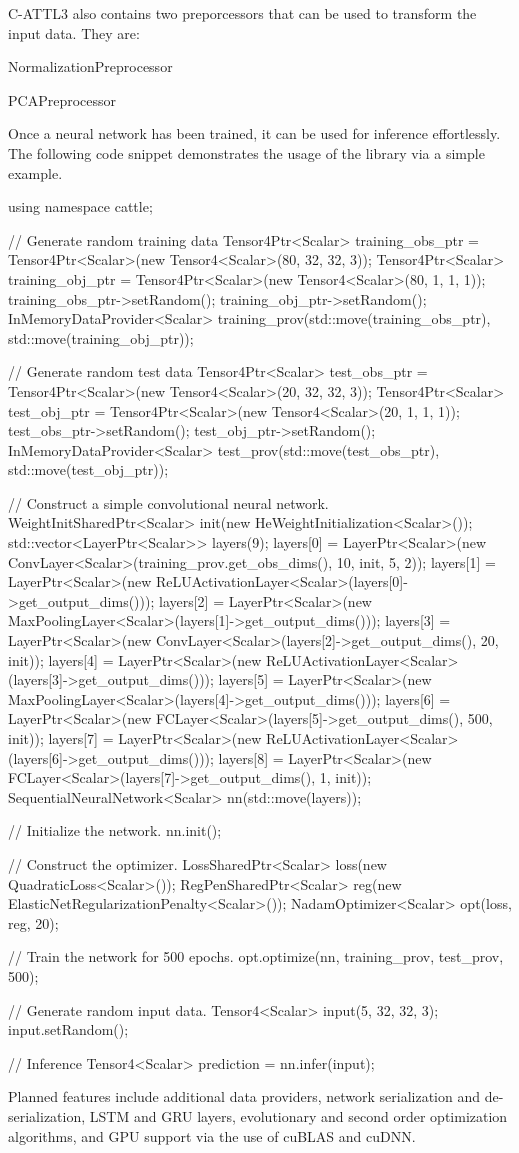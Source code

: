 C-\/\+A\+T\+T\+L3 also contains two preporcessors that can be used to transform the input data. They are\+:
\begin{DoxyItemize}
\item Normalization\+Preprocessor
\item P\+C\+A\+Preprocessor
\end{DoxyItemize}

Once a neural network has been trained, it can be used for inference effortlessly. The following code snippet demonstrates the usage of the library via a simple example. \begin{DoxyVerb}using namespace cattle;

// Generate random training data
Tensor4Ptr<Scalar> training_obs_ptr = Tensor4Ptr<Scalar>(new Tensor4<Scalar>(80, 32, 32, 3));
Tensor4Ptr<Scalar> training_obj_ptr = Tensor4Ptr<Scalar>(new Tensor4<Scalar>(80, 1, 1, 1));
training_obs_ptr->setRandom();
training_obj_ptr->setRandom();
InMemoryDataProvider<Scalar> training_prov(std::move(training_obs_ptr), std::move(training_obj_ptr));

// Generate random test data
Tensor4Ptr<Scalar> test_obs_ptr = Tensor4Ptr<Scalar>(new Tensor4<Scalar>(20, 32, 32, 3));
Tensor4Ptr<Scalar> test_obj_ptr = Tensor4Ptr<Scalar>(new Tensor4<Scalar>(20, 1, 1, 1));
test_obs_ptr->setRandom();
test_obj_ptr->setRandom();
InMemoryDataProvider<Scalar> test_prov(std::move(test_obs_ptr), std::move(test_obj_ptr));

// Construct a simple convolutional neural network.
WeightInitSharedPtr<Scalar> init(new HeWeightInitialization<Scalar>());
std::vector<LayerPtr<Scalar>> layers(9);
layers[0] = LayerPtr<Scalar>(new ConvLayer<Scalar>(training_prov.get_obs_dims(), 10, init, 5, 2));
layers[1] = LayerPtr<Scalar>(new ReLUActivationLayer<Scalar>(layers[0]->get_output_dims()));
layers[2] = LayerPtr<Scalar>(new MaxPoolingLayer<Scalar>(layers[1]->get_output_dims()));
layers[3] = LayerPtr<Scalar>(new ConvLayer<Scalar>(layers[2]->get_output_dims(), 20, init));
layers[4] = LayerPtr<Scalar>(new ReLUActivationLayer<Scalar>(layers[3]->get_output_dims()));
layers[5] = LayerPtr<Scalar>(new MaxPoolingLayer<Scalar>(layers[4]->get_output_dims()));
layers[6] = LayerPtr<Scalar>(new FCLayer<Scalar>(layers[5]->get_output_dims(), 500, init));
layers[7] = LayerPtr<Scalar>(new ReLUActivationLayer<Scalar>(layers[6]->get_output_dims()));
layers[8] = LayerPtr<Scalar>(new FCLayer<Scalar>(layers[7]->get_output_dims(), 1, init));
SequentialNeuralNetwork<Scalar> nn(std::move(layers));

// Initialize the network.
nn.init();

// Construct the optimizer.
LossSharedPtr<Scalar> loss(new QuadraticLoss<Scalar>());
RegPenSharedPtr<Scalar> reg(new ElasticNetRegularizationPenalty<Scalar>());
NadamOptimizer<Scalar> opt(loss, reg, 20);

// Train the network for 500 epochs.
opt.optimize(nn, training_prov, test_prov, 500);

// Generate random input data.
Tensor4<Scalar> input(5, 32, 32, 3);
input.setRandom();

// Inference
Tensor4<Scalar> prediction = nn.infer(input);
\end{DoxyVerb}


Planned features include additional data providers, network serialization and de-\/serialization, L\+S\+TM and G\+RU layers, evolutionary and second order optimization algorithms, and G\+PU support via the use of cu\+B\+L\+AS and cu\+D\+NN. 